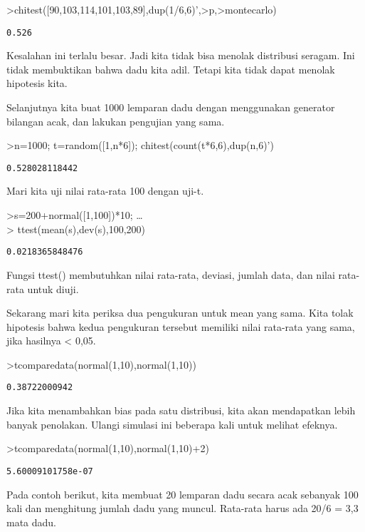 \documentclass[
]{book}
\begin{document}
\textgreater chitest({[}90,103,114,101,103,89{]},dup(1/6,6)',\textgreater p,\textgreater montecarlo)

\begin{verbatim}
0.526
\end{verbatim}

Kesalahan ini terlalu besar. Jadi kita tidak bisa menolak distribusi seragam. Ini tidak membuktikan bahwa dadu kita adil. Tetapi kita tidak dapat menolak hipotesis kita.

Selanjutnya kita buat 1000 lemparan dadu dengan menggunakan generator bilangan acak, dan lakukan pengujian yang sama.

\textgreater n=1000; t=random({[}1,n*6{]}); chitest(count(t*6,6),dup(n,6)')

\begin{verbatim}
0.528028118442
\end{verbatim}

Mari kita uji nilai rata-rata 100 dengan uji-t.

\textgreater s=200+normal({[}1,100{]})*10; \ldots{}\\
\textgreater{} ttest(mean(s),dev(s),100,200)

\begin{verbatim}
0.0218365848476
\end{verbatim}

Fungsi ttest() membutuhkan nilai rata-rata, deviasi, jumlah data, dan nilai rata-rata untuk diuji.

Sekarang mari kita periksa dua pengukuran untuk mean yang sama. Kita tolak hipotesis bahwa kedua pengukuran tersebut memiliki nilai rata-rata yang sama, jika hasilnya \textless{} 0,05.

\textgreater tcomparedata(normal(1,10),normal(1,10))

\begin{verbatim}
0.38722000942
\end{verbatim}

Jika kita menambahkan bias pada satu distribusi, kita akan mendapatkan lebih banyak penolakan. Ulangi simulasi ini beberapa kali untuk melihat efeknya.

\textgreater tcomparedata(normal(1,10),normal(1,10)+2)

\begin{verbatim}
5.60009101758e-07
\end{verbatim}

Pada contoh berikut, kita membuat 20 lemparan dadu secara acak sebanyak 100 kali dan menghitung jumlah dadu yang muncul. Rata-rata harus ada 20/6 = 3,3 mata dadu.
\end{document}
